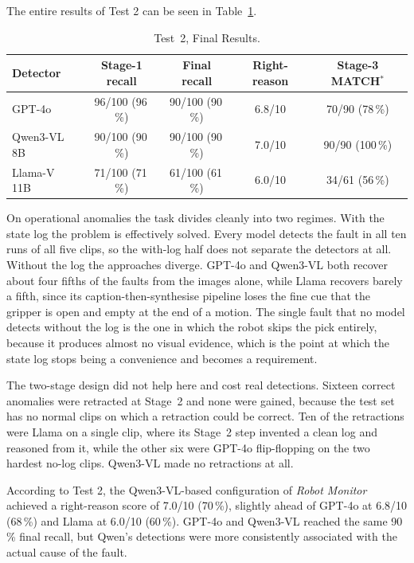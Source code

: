 \documentclass[11pt,a4paper]{article}
\begin{document}
The entire results of Test 2 can be seen in Table~\ref{tab:test2}.

\begin{table}[h]
\centering
\begin{tabular}{@{}l c c c c@{}}
\toprule
Detector & Stage-1 recall & Final recall & Right-reason & Stage-3 MATCH$^{\ast}$ \\
\midrule
GPT-4o          & 96/100 (96\,\%) & 90/100 (90\,\%) & 6.8/10 & 70/90 (78\,\%) \\
Qwen3-VL 8B     & 90/100 (90\,\%) & 90/100 (90\,\%) & 7.0/10 & 90/90 (100\,\%) \\
Llama-V 11B     & 71/100 (71\,\%) & 61/100 (61\,\%) & 6.0/10 & 34/61 (56\,\%) \\
\bottomrule
\end{tabular}
\caption{Test~2, Final Results.}
\label{tab:test2}
\end{table}
\FloatBarrier

On operational anomalies the task divides cleanly into two regimes. With
the state log the problem is effectively solved. Every model detects the
fault in all ten runs of all five clips, so the with-log half does not
separate the detectors at all. Without the log the approaches diverge.
GPT-4o and Qwen3-VL both recover about four fifths of the faults from the
images alone, while Llama recovers barely a fifth, since its
caption-then-synthesise pipeline loses the fine cue that the gripper is
open and empty at the end of a motion. The single fault that no model
detects without the log is the one in which the robot skips the pick
entirely, because it produces almost no visual evidence, which is the
point at which the state log stops being a convenience and becomes a
requirement.

The two-stage design did not help here and cost real detections. Sixteen
correct anomalies were retracted at Stage~2 and none were gained, because
the test set has no normal clips on which a retraction could be correct.
Ten of the retractions were Llama on a single clip, where its Stage~2 step
invented a clean log and reasoned from it, while the other six were GPT-4o
flip-flopping on the two hardest no-log clips. Qwen3-VL made no
retractions at all.

According to Test 2, the Qwen3-VL-based configuration of \textit{Robot
Monitor} achieved a right-reason score of 7.0/10 (70\,\%), slightly ahead
of GPT-4o at 6.8/10 (68\,\%) and Llama at 6.0/10 (60\,\%). GPT-4o and
Qwen3-VL reached the same 90\,\% final recall, but Qwen's detections were
more consistently associated with the actual cause of the fault.
\end{document}
